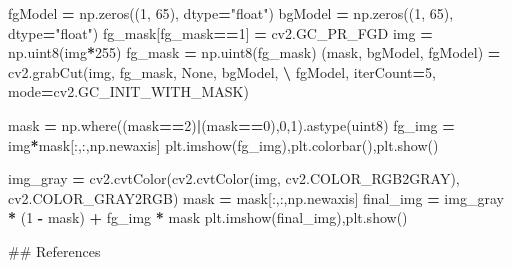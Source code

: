 \documentclass[
]{article}
\newenvironment{Shaded}{\begin{snugshade}}{\end{snugshade}}
\newcommand{\DecValTok}[1]{\textcolor[rgb]{0.00,0.00,0.81}{#1}}
\newcommand{\NormalTok}[1]{#1}
\newcommand{\OperatorTok}[1]{\textcolor[rgb]{0.81,0.36,0.00}{\textbf{#1}}}
\newcommand{\StringTok}[1]{\textcolor[rgb]{0.31,0.60,0.02}{#1}}
\newcommand{\VariableTok}[1]{\textcolor[rgb]{0.00,0.00,0.00}{#1}}
\begin{document}
\begin{Shaded}
\begin{Highlighting}[]
\NormalTok{fgModel }\OperatorTok{=}\NormalTok{ np.zeros((}\DecValTok{1}\NormalTok{, }\DecValTok{65}\NormalTok{), dtype}\OperatorTok{=}\StringTok{"float"}\NormalTok{)}
\NormalTok{bgModel }\OperatorTok{=}\NormalTok{ np.zeros((}\DecValTok{1}\NormalTok{, }\DecValTok{65}\NormalTok{), dtype}\OperatorTok{=}\StringTok{"float"}\NormalTok{)}
\NormalTok{fg\_mask[fg\_mask}\OperatorTok{==}\DecValTok{1}\NormalTok{] }\OperatorTok{=}\NormalTok{ cv2.GC\_PR\_FGD}
\NormalTok{img }\OperatorTok{=}\NormalTok{ np.uint8(img}\OperatorTok{*}\DecValTok{255}\NormalTok{)}
\NormalTok{fg\_mask }\OperatorTok{=}\NormalTok{ np.uint8(fg\_mask)}
\NormalTok{(mask, bgModel, fgModel) }\OperatorTok{=}\NormalTok{ cv2.grabCut(img, fg\_mask, }\VariableTok{None}\NormalTok{, bgModel, }\OperatorTok{\textbackslash{}}
\NormalTok{                                       fgModel, iterCount}\OperatorTok{=}\DecValTok{5}\NormalTok{, mode}\OperatorTok{=}\NormalTok{cv2.GC\_INIT\_WITH\_MASK)}

\NormalTok{mask }\OperatorTok{=}\NormalTok{ np.where((mask}\OperatorTok{==}\DecValTok{2}\NormalTok{)}\OperatorTok{|}\NormalTok{(mask}\OperatorTok{==}\DecValTok{0}\NormalTok{),}\DecValTok{0}\NormalTok{,}\DecValTok{1}\NormalTok{).astype(}\StringTok{\textquotesingle{}uint8\textquotesingle{}}\NormalTok{)}
\NormalTok{fg\_img }\OperatorTok{=}\NormalTok{ img}\OperatorTok{*}\NormalTok{mask[:,:,np.newaxis]}
\NormalTok{plt.imshow(fg\_img),plt.colorbar(),plt.show()}
\end{Highlighting}
\end{Shaded}

\begin{Shaded}
\begin{Highlighting}[]
\NormalTok{img\_gray }\OperatorTok{=}\NormalTok{ cv2.cvtColor(cv2.cvtColor(img, cv2.COLOR\_RGB2GRAY), cv2.COLOR\_GRAY2RGB) }
\NormalTok{mask }\OperatorTok{=}\NormalTok{ mask[:,:,np.newaxis]}
\NormalTok{final\_img }\OperatorTok{=}\NormalTok{ img\_gray }\OperatorTok{*}\NormalTok{ (}\DecValTok{1} \OperatorTok{{-}}\NormalTok{ mask) }\OperatorTok{+}\NormalTok{ fg\_img }\OperatorTok{*}\NormalTok{ mask}
\NormalTok{plt.imshow(final\_img),plt.show()}
\end{Highlighting}
\end{Shaded}

\#\# References
\end{document}
